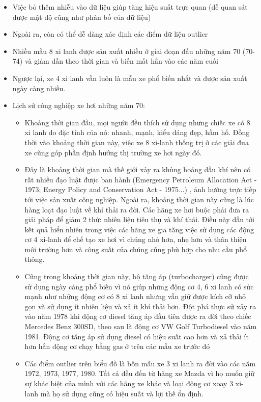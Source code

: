 \documentclass[a4paper, 12pt]{article}
\begin{document}
        \begin{itemize}
            \item Việc bỏ thêm nhiễu vào dữ liệu giúp tăng hiệu suất trực quan (dễ quan sát được mật độ cũng như phân bố của dữ liệu)
            \item Ngoài ra, còn có thể dễ dàng xác định các điểm dữ liệu outlier
            \item Nhiều mẫu 8 xi lanh được sản xuất nhiều ở giai đoạn đầu những năm 70 (70-74) và giảm dần theo thời gian và biến mất hẳn vào các năm cuối
            \item Ngược lại, xe 4 xi lanh vẫn luôn là mẫu xe phổ biến nhất và được sản xuất ngày càng nhiều.
            \item Lịch sử công nghiệp xe hơi những năm 70: 
                \begin{itemize}
                    \item Khoảng thời gian đầu, mọi người đều thích sử dụng những chiếc xe có 8 xi lanh do đặc tính của nó: nhanh, mạnh, kiểu dáng đẹp, hầm hố. Đồng thời vào khoảng thời gian này, việc xe 8 xi-lanh thống trị ở các giải đua xe cũng góp phần định hướng thị trường xe hơi ngày đó.
                    \item Đây là khoảng thời gian mà thế giới xảy ra khủng hoảng dầu khí nên có rất nhiều đạo luật được ban hành (Emergency Petroleum Allocation Act - 1973; Energy Policy and Conservation Act - 1975...) , ảnh hưởng trực tiếp tới việc sản xuất công nghiệp. Ngoài ra, khoảng thời gian này cũng là lúc hàng loạt đạo luật về khí thải ra đời. Các hãng xe hơi buộc phải đưa ra giải pháp để giảm 2 thứ: nhiên liệu tiêu thụ và khí thải. Điều này dẫn tới kết quả hiển nhiên trong việc các hãng xe gia tăng việc sử dụng các động cơ 4 xi-lanh để chế tạo xe hơi vì chúng nhỏ hơn, nhẹ hơn và thân thiện môi trường hơn và công suất của chúng cũng phù hợp cho nhu cầu phổ thông. 
                    \item Cũng trong khoảng thời gian này, bộ tăng áp (turbocharger) cũng được sử dụng ngày càng phổ biến vì nó giúp những động cơ 4, 6 xi lanh có sức mạnh như những động cơ có 8 xi lanh nhưng vẫn giữ được kích cỡ nhỏ gọn và sử dụng ít nhiên liệu và xả ít khí thải hơn. Đột phá thực sử xảy ra vào năm 1978 khi động cơ diesel tăng áp đầu tiên được ra đời theo chiếc Mercedes Benz 300SD, theo sau là động cơ VW Golf Turbodiesel vào năm 1981. Động cơ tăng áp sử dụng diesel có hiệu suất cao hơn và xả thải ít hơn hẳn động cơ chạy bằng gas ở trên các mẫu xe trước đó
                    \item Các điểm outlier trên biểu đồ là bốn mẫu xe 3 xi lanh ra đời vào các năm 1972, 1973, 1977, 1980. Tất cả đều đến từ hãng xe Mazda vì họ muốn giữ sự khác biệt của mình với các hãng xe khác và loại động cơ xoay 3 xi-lanh mà họ sử dụng cũng có hiệu suất và lợi thế ổn định.
                \end{itemize}
        \end{itemize}
    
\end{document}
